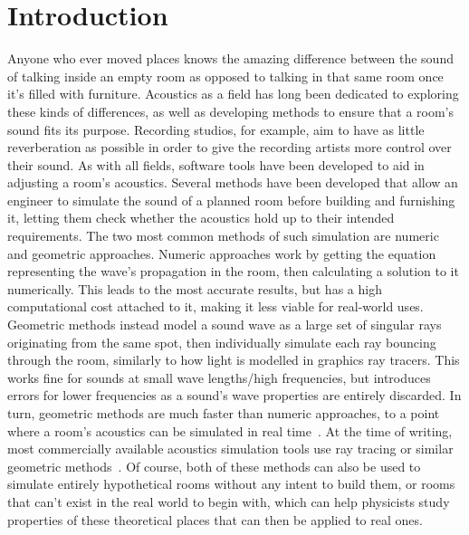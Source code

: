 \chapter{Introduction}

Anyone who ever moved places knows the amazing difference between the sound of talking inside an empty room
as opposed to talking in that same room once it's filled with furniture.
Acoustics as a field has long been dedicated to exploring these kinds of differences,
as well as developing methods to ensure that a room's sound fits its purpose.
Recording studios, for example, aim to have as little reverberation as possible in order to give the recording artists more control over their sound.
\newline
As with all fields, software tools have been developed to aid in adjusting a room's acoustics.
Several methods have been developed that allow an engineer to simulate the sound of a planned room before building and furnishing it,
letting them check whether the acoustics hold up to their intended requirements.
\newline
The two most common methods of such simulation are numeric and geometric approaches.
Numeric approaches work by getting the equation representing the wave's propagation in the room,
then calculating a solution to it numerically.
This leads to the most accurate results, but has a high computational cost attached to it,
making it less viable for real-world uses.
\newline
Geometric methods instead model a sound wave as a large set of singular rays originating from the same spot,
then individually simulate each ray bouncing through the room,
similarly to how light is modelled in graphics ray tracers.
This works fine for sounds at small wave lengths/high frequencies,
but introduces errors for lower frequencies as a sound's wave properties are entirely discarded.
In turn, geometric methods are much faster than numeric approaches,
to a point where a room's acoustics can be simulated in real time~\cite{Cha08}.
At the time of writing, most commercially available acoustics simulation tools use ray tracing or similar geometric methods~\cite{Th17}.
\newline
Of course, both of these methods can also be used to simulate entirely hypothetical rooms without any intent to build them,
or rooms that can't exist in the real world to begin with,
which can help physicists study properties of these theoretical places that can then be applied to real ones.
\newline
